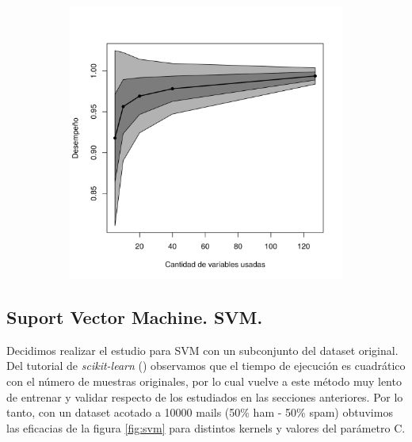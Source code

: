 \documentclass[a4paper,10pt]{article}
\begin{document}
\begin{figure}[H]
  \centering
  \begin{subfigure}[b]{0.4\textwidth}
    \includegraphics[width=\textwidth]{../imagenes/rf}
     \caption{}
  \end{subfigure}
  \label{fig:rf}
\end{figure}


\subsection{Suport Vector Machine. SVM.}

\par Decidimos realizar el estudio para SVM con un subconjunto del dataset original. Del tutorial de \emph{scikit-learn} (\cite{sklearn}) observamos que el tiempo de ejecución es cuadrático con el número de muestras originales, por lo cual vuelve a este método muy lento de entrenar y validar respecto de los estudiados en las secciones anteriores. Por lo tanto, con un dataset acotado a 10000 mails (50\% ham - 50\% spam) obtuvimos las eficacias de la figura \ref{fig:svm} para distintos kernels y valores del parámetro C.
\end{document}
